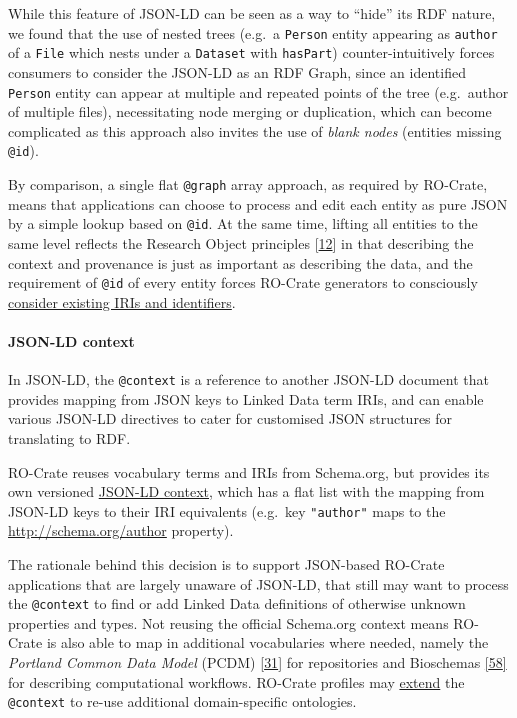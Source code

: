 While this feature of JSON-LD can be seen as a way to ``hide'' its RDF
nature, we found that the use of nested trees (e.g.~a \texttt{Person}
entity appearing as \texttt{author} of a \texttt{File} which nests under
a \texttt{Dataset} with \texttt{hasPart}) counter-intuitively forces
consumers to consider the JSON-LD as an RDF Graph, since an identified
\texttt{Person} entity can appear at multiple and repeated points of the
tree (e.g.~author of multiple files), necessitating node merging or
duplication, which can become complicated as this approach also invites
the use of \emph{blank nodes} (entities missing \texttt{@id}).

By comparison, a single flat \texttt{@graph} array approach, as required
by RO-Crate, means that applications can choose to process and edit each
entity as pure JSON by a simple lookup based on \texttt{@id}. At the
same time, lifting all entities to the same level reflects the Research
Object principles
{[}\href{https://www.research.manchester.ac.uk/portal/en/publications/why-linked-data-is-not-enough-for-scientists(479e591e-b295-4478-b0c7-a145c19dcd45).html}{12}{]}
in that describing the context and provenance is just as important as
describing the data, and the requirement of \texttt{@id} of every entity
forces RO-Crate generators to consciously
\href{https://www.researchobject.org/ro-crate/1.1/appendix/jsonld.html\#describing-entities-in-json-ld}{consider
existing IRIs and identifiers}.

\hypertarget{json-ld-context}{%
\paragraph{JSON-LD context}\label{json-ld-context}}

In JSON-LD, the \texttt{@context} is a reference to another JSON-LD
document that provides mapping from JSON keys to Linked Data term IRIs,
and can enable various JSON-LD directives to cater for customised JSON
structures for translating to RDF.

RO-Crate reuses vocabulary terms and IRIs from Schema.org, but provides
its own versioned \href{https://w3id.org/ro/crate/1.1/context}{JSON-LD
context}, which has a flat list with the mapping from JSON-LD keys to
their IRI equivalents (e.g.~key \texttt{"author"} maps to the
\url{http://schema.org/author} property).

The rationale behind this decision is to support JSON-based RO-Crate
applications that are largely unaware of JSON-LD, that still may want to
process the \texttt{@context} to find or add Linked Data definitions of
otherwise unknown properties and types. Not reusing the official
Schema.org context means RO-Crate is also able to map in additional
vocabularies where needed, namely the \emph{Portland Common Data Model}
(PCDM) \href{https://github.com/duraspace/pcdm/wiki}{{[}31{]}} for
repositories and Bioschemas
\href{https://iswc2017.semanticweb.org/paper-579/}{{[}58{]}} for
describing computational workflows. RO-Crate profiles may
\href{https://www.researchobject.org/ro-crate/1.1/appendix/jsonld.html\#extending-ro-crate}{extend}
the \texttt{@context} to re-use additional domain-specific ontologies.

